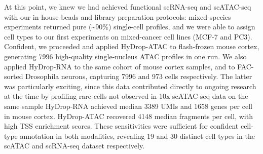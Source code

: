 At this point, we knew we had achieved functional scRNA-seq and scATAC-seq with our in-house beads and library preparation protocols: mixed-species experiments returned pure (\textasciitilde{90}\%) single-cell profiles, and we were able to assign cell types to our first experiments on mixed-cancer cell lines (MCF-7 and PC3). Confident, we proceeded and applied HyDrop-ATAC to flash-frozen mouse cortex, generating \num{7996} high-quality single-nucleus ATAC profiles in one run. We also applied HyDrop-RNA to the same cohort of mouse cortex samples, and to FAC-sorted Drosophila neurons, capturing \num{7996} and \num{973} cells respectively. The latter was particularly exciting, since this data contributed directly to ongoing research at the time by profiling rare cells not observed in 10x scATAC-seq data on the same sample HyDrop-RNA achieved median \num{3389} UMIs and \num{1658} genes per cell in mouse cortex. HyDrop-ATAC recovered \num{4148} median fragments per cell, with high TSS enrichment scores. These sensitivities were sufficient for confident cell-type annotation in both modalities, revealing 19 and 30 distinct cell types in the scATAC and scRNA-seq dataset respectively.